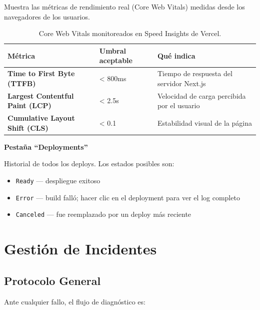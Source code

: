 \documentclass[12pt, a4paper]{article}
\begin{document}
Muestra las métricas de rendimiento real (Core Web Vitals) medidas desde los navegadores de los usuarios.

\begin{table}[H]
    \centering
    \begin{tabular}{p{5cm} p{3cm} p{5.5cm}}
        \toprule
        \textbf{Métrica} & \textbf{Umbral aceptable} & \textbf{Qué indica} \\
        \midrule
        \textbf{Time to First Byte (TTFB)}
            & < 800ms
            & Tiempo de respuesta del servidor Next.js \\[0.4cm]
        \textbf{Largest Contentful Paint (LCP)}
            & < 2.5s
            & Velocidad de carga percibida por el usuario \\[0.4cm]
        \textbf{Cumulative Layout Shift (CLS)}
            & < 0.1
            & Estabilidad visual de la página \\
        \bottomrule
    \end{tabular}
    \caption{Core Web Vitals monitoreados en Speed Insights de Vercel.}
\end{table}

\bigskip
\textbf{Pestaña ``Deployments''}

Historial de todos los deploys. Los estados posibles son:

\begin{itemize}
    \item \texttt{Ready} --- despliegue exitoso
    \item \texttt{Error} --- build falló; hacer clic en el deployment para ver el log completo
    \item \texttt{Canceled} --- fue reemplazado por un deploy más reciente
\end{itemize}

\section{Gestión de Incidentes}

\subsection{Protocolo General}

Ante cualquier fallo, el flujo de diagnóstico es:
\end{document}
